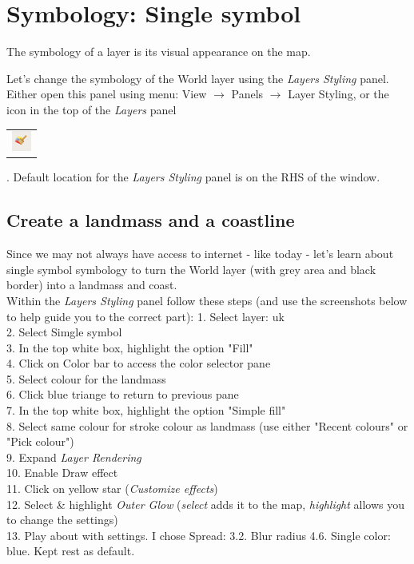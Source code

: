 \chapter{Symbology: Single symbol}

\pagestyle{fancy}
\fancyhf{}
\fancyhead[OC]{\leftmark}
\fancyhead[EC]{\rightmark}
\cfoot{\thepage}

The symbology of a layer is its visual appearance on the map.

Let's change the symbology of the World layer using the \textit{Layers Styling} panel. Either open this panel using menu: View $\rightarrow$ Panels  $\rightarrow$ Layer Styling, or the icon in the top of the \textit{Layers} panel  \begin{tabular}{@{}c@{}}\includegraphics[width=4ex]{images/layer_styling_panel_icon.png}\end{tabular}. Default location for the \textit{Layers Styling} panel is on the RHS of the window.


\section{Create a landmass and a coastline}

Since we may not always have access to internet - like today - let's learn about single symbol symbology to turn the World layer (with grey area and black border) into a landmass and coast.\\

Within the \emph{Layers Styling} panel follow these steps (and use the screenshots below to help guide you to the correct part):
1. Select layer: uk\\
2. Select Simgle symbol\\
3. In the top white box, highlight the option "Fill"\\
4. Click on Color bar to access the color selector pane\\
5. Select colour for the landmass\\
6. Click blue triange to return to previous pane\\
7. In the top white box, highlight the option "Simple fill"\\
8. Select same colour for stroke colour as landmass (use either "Recent colours" or "Pick colour")\\
9. Expand \textit{Layer Rendering}\\
10. Enable Draw effect\\
11. Click on yellow star (\textit{Customize effects})\\
12. Select \& highlight \textit{Outer Glow} (\emph{select} adds it to the map, \emph{highlight} allows you to change the settings)\\
13. Play about with settings. I chose Spread: 3.2. Blur radius 4.6. Single color: blue. Kept rest as default.\\

